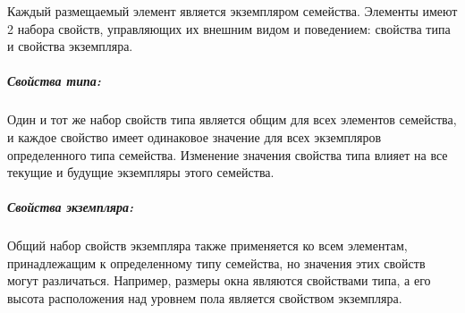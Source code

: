 Каждый размещаемый элемент является экземпляром семейства.
Элементы имеют 2 набора свойств, управляющих их внешним видом и поведением:
свойства типа и свойства экземпляра.%
\cite{DocRevit}

\subparagraph{Свойства типа:}

Один и тот же набор свойств типа является общим для всех элементов семейства,
и каждое свойство имеет одинаковое значение для всех экземпляров определенного типа семейства.
Изменение значения свойства типа влияет на все текущие и будущие экземпляры этого семейства.

\subparagraph{Свойства экземпляра:}

Общий набор свойств экземпляра также применяется ко всем элементам,
принадлежащим к определенному типу семейства,
но значения этих свойств могут различаться.
Например, размеры окна являются свойствами типа,
а его высота расположения над уровнем пола является свойством экземпляра.
